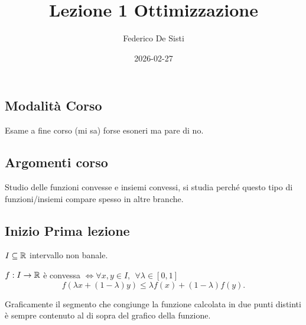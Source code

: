 \documentclass[12px]{article}
\title{Lezione 1 Ottimizzazione}
\date{2026-02-27}
\author{Federico De Sisti}
\begin{document}
	\maketitle
	\newpage
	\subsection{Modalità Corso}
	Esame a fine corso (mi sa) forse esoneri ma pare di no.
	\subsection{Argomenti corso}
	Studio delle funzioni convesse e insiemi convessi, si studia perché questo tipo di funzioni/insiemi compare spesso in altre branche.
	\subsection{Inizio Prima lezione}
	$I\subseteq \mathbb{R}$ intervallo non banale.\\
	\begin{defi}
		$f:I \rightarrow\mathbb{R}$ è convessa $ \Leftrightarrow \forall x,y\in I, \ \ \forall \lambda \in[0,1]$
		\[
		f( \lambda x +  (1- \lambda)y)\leq \lambda f(x) + (1- \lambda)f(y)
		.\] 
	\end{defi}
	Graficamente il segmento che congiunge la funzione calcolata in due punti distinti è sempre contenuto al di sopra del grafico della funzione.\\
\end{document}
